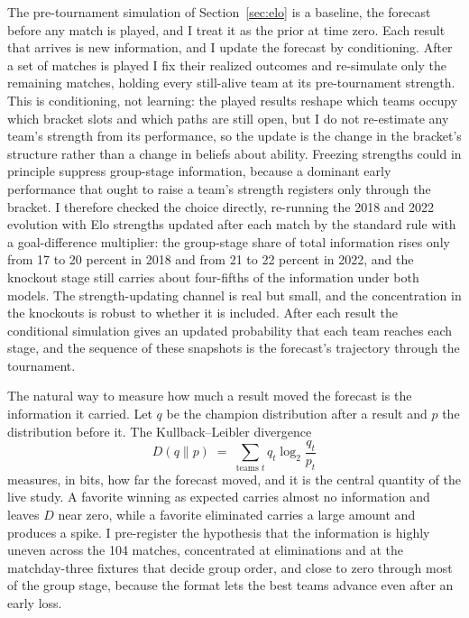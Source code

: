 \documentclass[11pt,letterpaper]{article}
\begin{document}
The pre-tournament simulation of Section~\ref{sec:elo} is a baseline, the forecast before any match is played, and I treat it as the prior at time zero. Each result that arrives is new information, and I update the forecast by conditioning. After a set of matches is played I fix their realized outcomes and re-simulate only the remaining matches, holding every still-alive team at its pre-tournament strength. This is conditioning, not learning: the played results reshape which teams occupy which bracket slots and which paths are still open, but I do not re-estimate any team's strength from its performance, so the update is the change in the bracket's structure rather than a change in beliefs about ability. Freezing strengths could in principle suppress group-stage information, because a dominant early performance that ought to raise a team's strength registers only through the bracket. I therefore checked the choice directly, re-running the 2018 and 2022 evolution with Elo strengths updated after each match by the standard rule with a goal-difference multiplier: the group-stage share of total information rises only from 17 to 20 percent in 2018 and from 21 to 22 percent in 2022, and the knockout stage still carries about four-fifths of the information under both models. The strength-updating channel is real but small, and the concentration in the knockouts is robust to whether it is included. After each result the conditional simulation gives an updated probability that each team reaches each stage, and the sequence of these snapshots is the forecast's trajectory through the tournament.

The natural way to measure how much a result moved the forecast is the information it carried. Let $q$ be the champion distribution after a result and $p$ the distribution before it. The Kullback--Leibler divergence
\begin{equation}
D(q \parallel p) \;=\; \sum_{\text{teams } t} q_t \log_2 \frac{q_t}{p_t}
\label{eq:kl}
\end{equation}
measures, in bits, how far the forecast moved, and it is the central quantity of the live study. A favorite winning as expected carries almost no information and leaves $D$ near zero, while a favorite eliminated carries a large amount and produces a spike. I pre-register the hypothesis that the information is highly uneven across the 104 matches, concentrated at eliminations and at the matchday-three fixtures that decide group order, and close to zero through most of the group stage, because the format lets the best teams advance even after an early loss.
\end{document}
